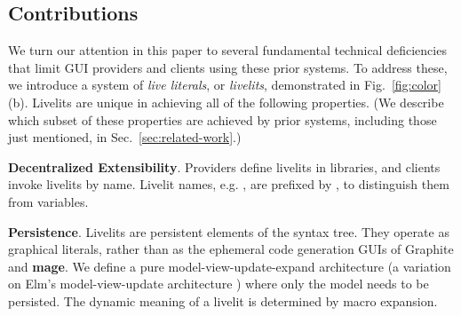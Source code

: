 \subsection{Contributions}

We turn our attention in this paper to several fundamental technical
deficiencies that limit GUI providers and clients using these prior systems.
To address these, 
we introduce a system of \emph{live literals}, or \emph{livelits}, 
demonstrated in Fig.~\ref{fig:color}(b). 
Livelits are unique in achieving all of the following properties.
(We describe which subset of these properties 
are achieved by prior systems,
including those just mentioned, 
in Sec.~\ref{sec:related-work}.)

\newcommand{\llproperty}[1]{\vspace{5px}\noindent\textbf{#1}.}

\llproperty{Decentralized Extensibility}
    Providers define livelits in libraries, and 
    clients invoke livelits by name. Livelit names, e.g. ,  are prefixed by \li{\$},    
    to distinguish them from variables.
 
\llproperty{Persistence}
  Livelits are persistent elements of the syntax tree. They operate as  
  graphical literals, rather than as the ephemeral code generation GUIs of Graphite and \textbf{mage}. 
  We define a pure model-view-update-expand architecture
  (a variation on Elm's model-view-update architecture \cite{ElmArchitecture}) 
  where only the model needs to be persisted.
  The dynamic meaning of a livelit is determined by macro expansion.

